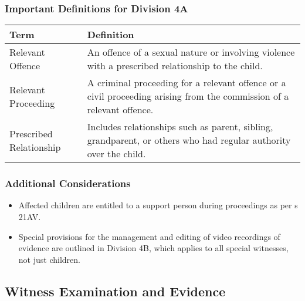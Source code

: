 \subsubsection{Important Definitions for Division
4A}\label{important-definitions-for-division-4a}

\begin{longtable}[]{@{}
  >{\raggedright\arraybackslash}p{}
  >{\raggedright\arraybackslash}p{}@{}}
\toprule\noalign{}
\begin{minipage}[b]{\linewidth}\raggedright
Term
\end{minipage} & \begin{minipage}[b]{\linewidth}\raggedright
Definition
\end{minipage} \\
\midrule\noalign{}
\endhead
\bottomrule\noalign{}
\endlastfoot
Relevant Offence & An offence of a sexual nature or involving violence
with a prescribed relationship to the child. \\
Relevant Proceeding & A criminal proceeding for a relevant offence or a
civil proceeding arising from the commission of a relevant offence. \\
Prescribed Relationship & Includes relationships such as parent,
sibling, grandparent, or others who had regular authority over the
child. \\
\end{longtable}

\subsubsection{Additional
Considerations}\label{additional-considerations}

\begin{itemize}
\tightlist
\item
  Affected children are entitled to a support person during proceedings
  as per s 21AV.
\item
  Special provisions for the management and editing of video recordings
  of evidence are outlined in Division 4B, which applies to all special
  witnesses, not just children.
\end{itemize}

\subsection{  Witness Examination and
Evidence}\label{witness-examination-and-evidence}

